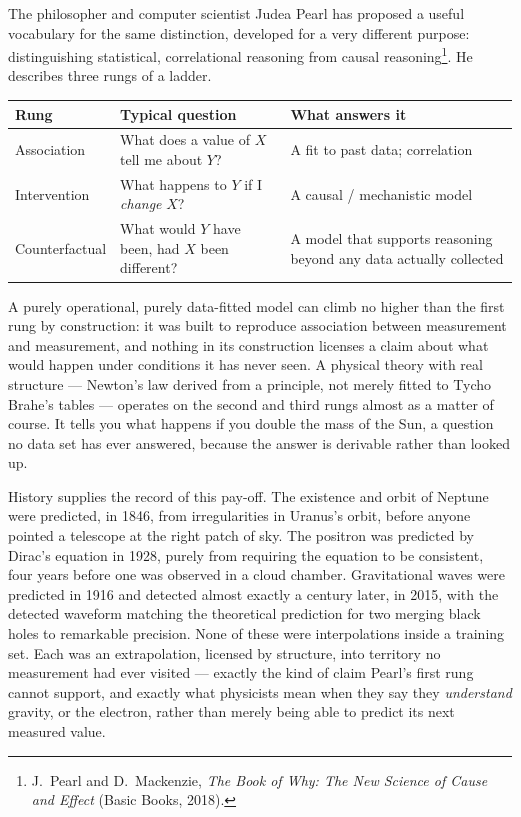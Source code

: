 \documentclass[12pt]{book}
\begin{document}
The philosopher and computer scientist Judea Pearl has proposed a useful vocabulary for the same distinction, developed for a very different purpose: distinguishing statistical, correlational reasoning from causal reasoning\footnote{J.~Pearl and D.~Mackenzie, \emph{The Book of Why: The New Science of Cause and Effect} (Basic Books, 2018).}. He describes three rungs of a ladder.

\begin{center}
\begin{tabular}{@{}>{\raggedright\arraybackslash}p{2.6cm} >{\raggedright\arraybackslash}p{4.6cm} >{\raggedright\arraybackslash}p{4.6cm}@{}}
\toprule
\textbf{Rung} & \textbf{Typical question} & \textbf{What answers it} \\
\midrule
Association & What does a value of $X$ tell me about $Y$? & A fit to past data; correlation \\
Intervention & What happens to $Y$ if I \emph{change} $X$? & A causal / mechanistic model \\
Counterfactual & What would $Y$ have been, had $X$ been different? & A model that supports reasoning beyond any data actually collected \\
\bottomrule
\end{tabular}
\end{center}

A purely operational, purely data-fitted model can climb no higher than the first rung by construction: it was built to reproduce association between measurement and measurement, and nothing in its construction licenses a claim about what would happen under conditions it has never seen. A physical theory with real structure --- Newton's law derived from a principle, not merely fitted to Tycho Brahe's tables --- operates on the second and third rungs almost as a matter of course. It tells you what happens if you double the mass of the Sun, a question no data set has ever answered, because the answer is derivable rather than looked up.

History supplies the record of this pay-off. The existence and orbit of Neptune were predicted, in 1846, from irregularities in Uranus's orbit, before anyone pointed a telescope at the right patch of sky. The positron was predicted by Dirac's equation in 1928, purely from requiring the equation to be consistent, four years before one was observed in a cloud chamber. Gravitational waves were predicted in 1916 and detected almost exactly a century later, in 2015, with the detected waveform matching the theoretical prediction for two merging black holes to remarkable precision. None of these were interpolations inside a training set. Each was an extrapolation, licensed by structure, into territory no measurement had ever visited --- exactly the kind of claim Pearl's first rung cannot support, and exactly what physicists mean when they say they \emph{understand} gravity, or the electron, rather than merely being able to predict its next measured value.
\end{document}
